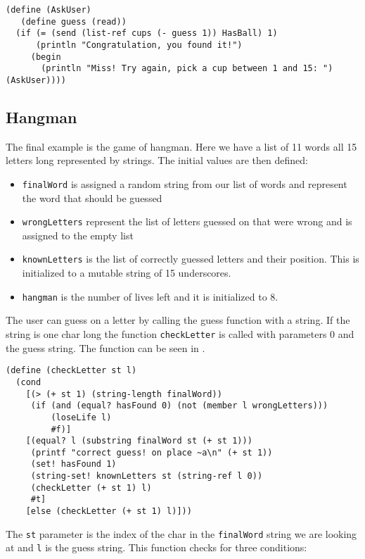 \begin{lstlisting}[caption={The AskUser function in DrRacket}, label={DrRacket_AskUser}]
(define (AskUser)
   (define guess (read))
  (if (= (send (list-ref cups (- guess 1)) HasBall) 1)
      (println "Congratulation, you found it!")
     (begin
       (println "Miss! Try again, pick a cup between 1 and 15: ") (AskUser))))
\end{lstlisting}



\subsection{Hangman}
The final example is the game of hangman.
Here we have a list of 11 words all 15 letters long represented by strings. The initial values are then defined:
\begin{itemize}
\item \lstinline!finalWord! is assigned a random string from our list of words and represent the word that should be guessed
\item \lstinline!wrongLetters! represent the list of letters guessed on that were wrong and is assigned to the empty list
\item \lstinline!knownLetters! is the list of correctly guessed letters and their position. This is initialized to a mutable string of 15 underscores.
\item \lstinline!hangman! is the number of lives left and it is initialized to 8.
\end{itemize}

The user can guess on a letter by calling the guess function with a string.
If the string is one char long the function \lstinline!checkLetter! is called with parameters 0 and the guess string. The function can be seen in .

\begin{lstlisting}[caption={The checkLetter function in DrRacket}, label={DrRacket_checkLetter}]
(define (checkLetter st l)
  (cond
    [(> (+ st 1) (string-length finalWord))
     (if (and (equal? hasFound 0) (not (member l wrongLetters)))
         (loseLife l)
         #f)]
    [(equal? l (substring finalWord st (+ st 1)))
     (printf "correct guess! on place ~a\n" (+ st 1))
     (set! hasFound 1)
     (string-set! knownLetters st (string-ref l 0))
     (checkLetter (+ st 1) l)
     #t]
    [else (checkLetter (+ st 1) l)]))
\end{lstlisting}

The \lstinline!st! parameter is the index of the char in the \lstinline!finalWord! string we are looking at and \lstinline!l! is the guess string.
This function checks for three conditions:

